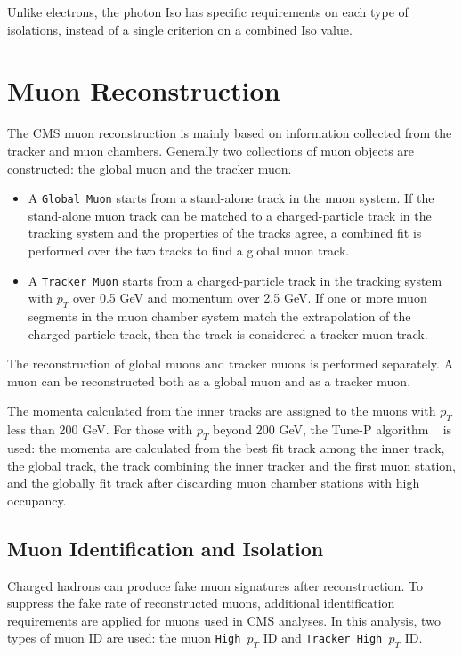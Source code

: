 \vspace{0.3cm}
Unlike electrons, the photon Iso has specific requirements on each type of isolations, instead of a single criterion on a combined Iso value.

\section{Muon Reconstruction}\label{sec:muonrecon}
The CMS muon reconstruction is mainly based on information collected from the tracker and muon chambers. Generally two collections of muon objects are constructed: the global muon and the tracker muon.~\cite{ob_muonconst1}
\begin{itemize}
\item A \texttt{Global Muon} starts from a stand-alone track in the muon system. If the stand-alone muon track can be matched to a charged-particle track in the tracking system and the properties of the tracks agree, a combined fit is performed over the two tracks to find a global muon track.
\item A \texttt{Tracker Muon} starts from a charged-particle track in the tracking system with $p_{T}$ over 0.5 GeV and momentum over 2.5 GeV. If one or more muon segments in the muon chamber system match the extrapolation of the charged-particle track, then the track is considered a tracker muon track.
\end{itemize}

The reconstruction of global muons and tracker muons is performed separately. A muon can be reconstructed both as a global muon and as a tracker muon.

\vspace{0.3cm}
The momenta calculated from the inner tracks are assigned to the muons with $p_{T}$ less than 200 GeV. For those with $p_T$ beyond 200 GeV, the Tune-P algorithm ~\cite{ob_muonconst2} is used: the momenta are calculated from the best fit track among the inner track, the global track, the track combining the inner tracker and the first muon station, and the globally fit track after discarding muon chamber stations with high occupancy. 

\subsection{Muon Identification and Isolation}\label{sec:ob_midiso}
Charged hadrons can produce fake muon signatures after reconstruction. To suppress the fake rate of reconstructed muons, additional identification requirements are applied for muons used in CMS analyses. In this analysis, two types of muon ID are used: the muon \texttt{High $p_T$} ID and \texttt{Tracker High $p_T$} ID. 

